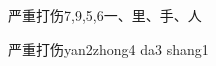 \begin{entry}{严重打伤}{7,9,5,6}{⼀、⾥、⼿、⼈}
  \begin{phonetics}{严重打伤}{yan2zhong4 da3 shang1}
  \end{phonetics}
\end{entry}
